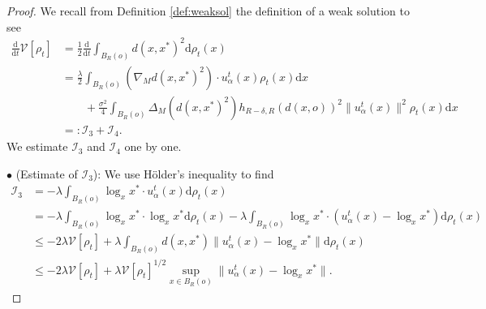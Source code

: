 \documentclass[11pt]{amsart}
\def\d{\mathrm{d}}
\newcommand{\p}{o}%
\newcommand{\dist}{d}%
\begin{document}
\begin{proof}
We recall from Definition \ref{def:weaksol} the definition of a weak solution to see 
 \begin{align*}
\frac{\d}{\d t}\mathcal{V}[\rho_t]
&=\frac{1}{2}\frac{\d}{\d t}\int_{B_R(\p)} \dist(x, x^*)^2 \d \rho_t(x)\\
&=\frac{\lambda}{2}\int_{B_R(\p)} \left(\nabla_M\dist(x, x^*)^2\right)\cdot u_\alpha^t(x)\rho_t(x)\d x\\
&\qquad+\frac{\sigma^2}{4}\int_{B_R(\p)} \Delta_M(\dist(x, x^*)^2)h_{R-\delta, R}\left(\dist(x, \p)\right)^2 \|u_\alpha^t(x)\|^2 \rho_t(x) \d x\\
&=:\mathcal{I}_3+\mathcal{I}_4.
\end{align*}
We  estimate $\mathcal{I}_3$ and $\mathcal{I}_4$ one by one. \newline


\noindent $\bullet$ (Estimate of $\mathcal I_3$): We use H\"older's inequality to find 
\begin{align*}
\mathcal{I}_3&=-\lambda\int_{B_R(\p)} \log_xx^* \cdot u_\alpha^t(x) \d\rho_t(x)\\
&=-\lambda \int_{B_R(\p)} \log_xx^*\cdot \log_xx^*\d\rho_t(x)-\lambda\int_{B_R(\p)} \log_xx^*\cdot(u_\alpha^t(x)-\log_xx^*)\d\rho_t(x)\\
&\leq-2\lambda \mathcal{V}[\rho_t]+\lambda \int_{B_R(\p)}\dist(x, x^*)\|u_\alpha^t(x)-\log_xx^*\|\d\rho_t(x)\\
&\leq -2\lambda\mathcal{V}[\rho_t]+\lambda \mathcal{V}[\rho_t]^{1/2}\sup_{x\in B_R(o)}\|u_\alpha^t(x)-\log_xx^*\|.
\end{align*}


\end{proof}
\end{document}
